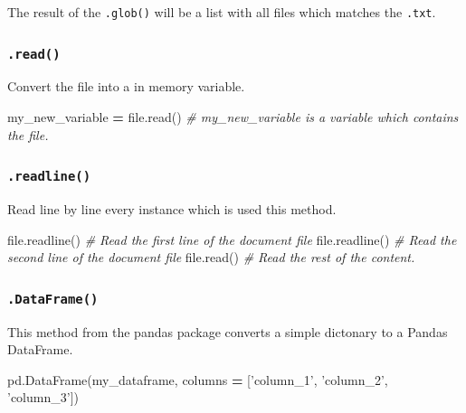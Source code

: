 \documentclass[]{book}
\newenvironment{Shaded}{\begin{snugshade}}{\end{snugshade}}
\newcommand{\StringTok}[1]{\textcolor[rgb]{0.31,0.60,0.02}{#1}}
\newcommand{\CommentTok}[1]{\textcolor[rgb]{0.56,0.35,0.01}{\textit{#1}}}
\newcommand{\OperatorTok}[1]{\textcolor[rgb]{0.81,0.36,0.00}{\textbf{#1}}}
\newcommand{\BuiltInTok}[1]{#1}
\newcommand{\NormalTok}[1]{#1}
\begin{document}
The result of the \texttt{.glob()} will be a list with all files which
matches the \texttt{.txt}.

\subsubsection{\texorpdfstring{\texttt{.read()}}{.read()}}\label{read}

Convert the file into a in memory variable.

\begin{Shaded}
\begin{Highlighting}[]
\NormalTok{my_new_variable }\OperatorTok{=} \BuiltInTok{file}\NormalTok{.read() }\CommentTok{# my_new_variable is a variable which contains the file.}
\end{Highlighting}
\end{Shaded}

\subsubsection{\texorpdfstring{\texttt{.readline()}}{.readline()}}\label{readline}

Read line by line every instance which is used this method.

\begin{Shaded}
\begin{Highlighting}[]
\BuiltInTok{file}\NormalTok{.readline() }\CommentTok{# Read the first line of the document file}
\BuiltInTok{file}\NormalTok{.readline() }\CommentTok{# Read the second line of the document file}
\BuiltInTok{file}\NormalTok{.read()     }\CommentTok{# Read the rest of the content.}
\end{Highlighting}
\end{Shaded}

\subsubsection{\texorpdfstring{\texttt{.DataFrame()}}{.DataFrame()}}\label{dataframe}

This method from the pandas package converts a simple dictonary to a
Pandas DataFrame.

\begin{Shaded}
\begin{Highlighting}[]
\NormalTok{pd.DataFrame(my_dataframe, columns }\OperatorTok{=}\NormalTok{ [}\StringTok{'column_1'}\NormalTok{, }\StringTok{'column_2'}\NormalTok{, }\StringTok{'column_3'}\NormalTok{])}
\end{Highlighting}
\end{Shaded}
\end{document}
